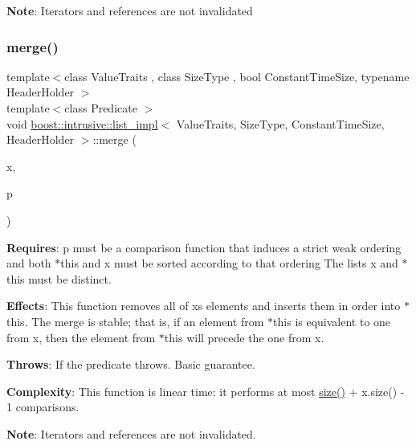 {\bfseries Note}\+: Iterators and references are not invalidated \mbox{\label{classboost_1_1intrusive_1_1list__impl_acae4748c2c7891009cafd2b2a1adc057}} 
\subsubsection{\texorpdfstring{merge()}{merge()}\hspace{0.1cm}{\footnotesize\ttfamily [2/2]}}
{\footnotesize\ttfamily template$<$class Value\+Traits , class Size\+Type , bool Constant\+Time\+Size, typename Header\+Holder $>$ \\
template$<$class Predicate $>$ \\
void \hyperlink{classboost_1_1intrusive_1_1list__impl}{boost\+::intrusive\+::list\+\_\+impl}$<$ Value\+Traits, Size\+Type, Constant\+Time\+Size, Header\+Holder $>$\+::merge (\begin{DoxyParamCaption}\item[{\hyperlink{classboost_1_1intrusive_1_1list__impl}{list\+\_\+impl}$<$ Value\+Traits, Size\+Type, Constant\+Time\+Size, Header\+Holder $>$ \&}]{x,  }\item[{Predicate}]{p }\end{DoxyParamCaption})\hspace{0.3cm}{\ttfamily [inline]}}

{\bfseries Requires}\+: p must be a comparison function that induces a strict weak ordering and both $\ast$this and x must be sorted according to that ordering The lists x and $\ast$this must be distinct.

{\bfseries Effects}\+: This function removes all of x\textquotesingle{}s elements and inserts them in order into $\ast$this. The merge is stable; that is, if an element from $\ast$this is equivalent to one from x, then the element from $\ast$this will precede the one from x.

{\bfseries Throws}\+: If the predicate throws. Basic guarantee.

{\bfseries Complexity}\+: This function is linear time\+: it performs at most \hyperlink{classboost_1_1intrusive_1_1list__impl_a9da0074a31566f3a7dbc3cd1a2d752c1}{size()} + x.\+size() -\/ 1 comparisons.

{\bfseries Note}\+: Iterators and references are not invalidated. \mbox{\label{classboost_1_1intrusive_1_1list__impl_a8999914d675056b42a4e1d5a40fceb1b}} 
